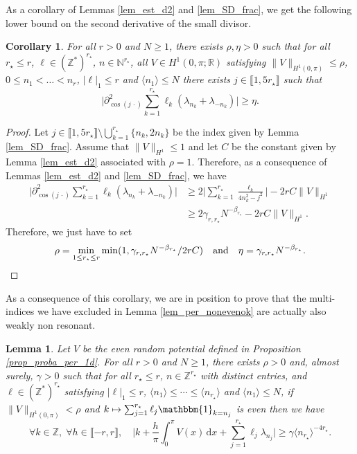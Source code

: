 \documentclass[JEP,XML,SOM,Unicode,NoEqCountersInSection,published]{cedram}
\newcommand\mto{\mathchoice{\longmapsto}{\mapsto}{\mapsto}{\mapsto}}
\newtheorem{corollary}[theorem]{Corollary}
\newtheorem{lemma}[theorem]{Lemma}
\theoremstyle{definition}
\begin{document}
As a corollary of Lemmas \ref{lem_est_d2} and \ref{lem_SD_frac}, we get the following lower bound on the second derivative of the small divisor.
\begin{corollary} \label{cor_der2}For all $r>0$ and $N\geq 1$, there exists $\rho,\eta>0$ such that for all $r_\star \leq r$, $\ell \in (\mathbb{Z}^*)^{r_\star}$, $n\in \mathbb{N}^{r_\star}$, all $V\in H^1(0,\pi;\mathbb{R})$ satisfying $\|V\|_{H^1(0,\pi)} \leq \rho$, $0\leq n_1 < \dots < n_r$, $|\ell|_{1} \leq r$ and $\langle n_1 \rangle \leq N$ there exists $j\in \llbracket 1,5r_\star \rrbracket$ such that
\[
\biggl| \partial^2_{\cos(j \,\cdot)} \sum_{k=1}^{r_\star} \ell_k (\lambda_{n_k} + \lambda_{-n_k}) \biggr| \geq \eta.
\]
\end{corollary}
\begin{proof} Let $j\in \llbracket 1,5r_\star \rrbracket \setminus \bigcup_{k=1}^{r_\star}\{ n_k,2n_k\}$ be the index given by Lemma \ref{lem_SD_frac}. Assume that $\|V\|_{H^1} \leq 1$ and let $C$ be the constant given by Lemma \ref{lem_est_d2} associated with $\rho=1$. Therefore, as a consequence of Lemmas \ref{lem_est_d2} and \ref{lem_SD_frac}, we have
\begin{equation*}
\begin{split}
\biggl| \partial^2_{\cos(j \,\cdot)} \sum_{k=1}^{r_\star} \ell_k (\lambda_{n_k} + \lambda_{-n_k}) \biggr| &\geq 2\biggl| \sum_{k=1}^{r_\star} \frac{\ell_k}{4n_k^2-j^2} \biggr| - 2 r C \|V\|_{H^1} \\ &\geq 2\gamma_{r,r_\star} N^{-\beta_{r_\star}} - 2 r C \|V\|_{H^1}.
\end{split}
\end{equation*}
Therefore, we just have to set
\[
\rho = \min_{1\leq r_\star \leq r} \min(1, \gamma_{r,r_\star} N^{-\beta_{r_\star}} / 2rC)\quad\text{and}\quad\eta = \gamma_{r,r_\star} N^{-\beta_{r_\star}}.\qedhere
\]
\end{proof}
As a consequence of this corollary, we are in position to prove that the multi-indices we have excluded in Lemma \ref{lem_per_nonevenok} are actually also weakly non resonant.
\begin{lemma}
\label{lem_per_evenok} Let $V$ be the even random potential defined in Proposition \ref{prop_proba_per_1d}. For all $r\!>\!0$ and $N\geq 1$, there exists $\rho\!>\!0$ and, almost surely, $\gamma\!>\!0$ such that for all $r_\star \!\leq\! r$, $n\in \mathbb{Z}^{r_\star}$ with distinct entries, and $\ell \in (\mathbb{Z}^*)^{r_\star}$ satisfying $|\ell|_1 \!\leq\! r$, $\langle n_1 \rangle \!\leq\! \cdots \!\leq\! \langle n_{r_\star} \rangle$ and $\langle n_1 \rangle \!\leq\! N$, if $\| V\|_{H^1(0,\pi)} < \rho$ and $ k \mto \sum_{j=1}^{r_\star} \ell_j \mathbbm{1}_{ k = n_j } $ is even then we have
\[
\forall k\in \mathbb{Z},\; \forall h\in \llbracket -r,r \rrbracket, \quad \biggl|k+\frac{h}\pi \int_0^\pi V(x) \, \mathrm{d}x + \sum_{j=1}^{r_\star} \ell_j \lambda_{n_j}\biggr|\geq \gamma \langle n_{r_\star} \rangle^{-4 r_\star}.
\]
\end{lemma}
\end{document}
